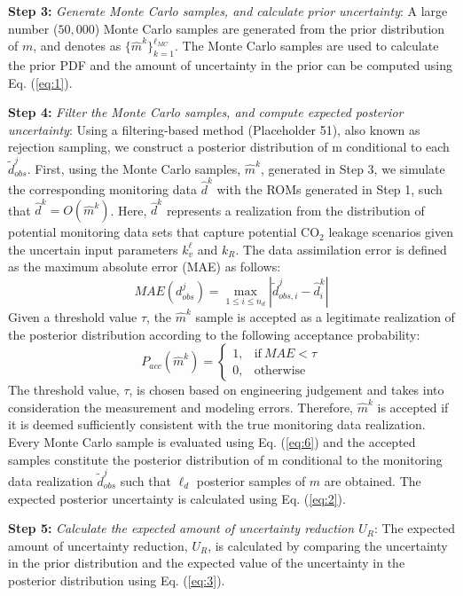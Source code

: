 \documentclass[10pt, twoside]{article}
\begin{document}
\textbf{Step 3:} \textit{Generate Monte Carlo samples, and calculate prior uncertainty}: A large number ($50,000$) Monte Carlo samples are generated from the prior distribution of $m$, and denotes as $\{\hat{m}^k\}_{k=1}^{\ell_{MC}}$. The Monte Carlo samples are used to calculate the prior PDF and the amount of uncertainty in the prior can be computed using Eq. (\ref{eq:1}).

\textbf{Step 4:} \textit{Filter the Monte Carlo samples, and compute expected posterior uncertainty}: Using a filtering-based method (Placeholder 51), also known as rejection sampling, we construct a posterior distribution of m conditional to each $\widetilde{d}_{obs}^j$. First, using the Monte Carlo samples, $\hat{m}^k$, generated in Step 3, we simulate the corresponding monitoring data $\hat{d}^k$ with the ROMs generated in Step 1, such that $\hat{d}^k=O(\hat{m}^k)$. Here, $\hat{d}^k$ represents a realization from the distribution of potential monitoring data sets that capture potential CO$_2$ leakage scenarios given the uncertain input parameters $k_v^\ell$ and $k_R$. The data assimilation error is defined as the maximum absolute error (MAE) as follows:
\begin{equation} \label{eq:5}
    MAE(d^j_{obs}) = \max\limits_{1\leq i \leq n_d} | \widetilde{d}^j_{obs,i} - \hat{d}^k_i | 
\end{equation}
Given a threshold value $\tau$, the $\hat{m}^k$ sample is accepted as a legitimate realization of the posterior distribution according to the following acceptance probability:
\begin{equation} \label{eq:6}
    P_{acc}(\hat{m}^k) = 
    \begin{cases}
      1, & \text{if}\ MAE<\tau \\
      0, & \text{otherwise}
    \end{cases}
\end{equation}
The threshold value, $\tau$, is chosen based on engineering judgement and takes into consideration the measurement and modeling errors. Therefore, $\hat{m}^k$ is accepted if it is deemed sufficiently consistent with the true monitoring data realization. Every Monte Carlo sample is evaluated using Eq. (\ref{eq:6}) and the accepted samples constitute the posterior distribution of m conditional to the monitoring data realization $\widetilde{d}^j_{obs}$ such that $\ell_d$ posterior samples of $m$ are obtained. The expected posterior uncertainty is calculated using Eq. (\ref{eq:2}). 

\textbf{Step 5:} \textit{Calculate the expected amount of uncertainty reduction $U_R$}: The expected amount of uncertainty reduction, $U_R$, is calculated by comparing the uncertainty in the prior distribution and the expected value of the uncertainty in the posterior distribution using Eq. (\ref{eq:3}). 
\end{document}
